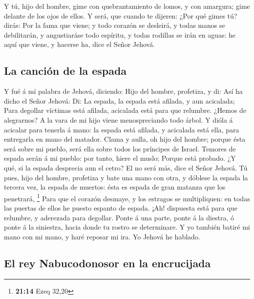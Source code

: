  Y tú, hijo del hombre, gime con quebrantamiento de lomos,
y con amargura; gime delante de los ojos de ellos.  Y
será, que cuando te dijeren: ¿Por qué gimes tú? dirás: Por la fama que
viene; y todo corazón se desleirá, y todas manos se debilitarán, y
angustiaráse todo espíritu, y todas rodillas se irán en aguas: he aquí
que viene, y hacerse ha, dice el Señor Jehová.

\hypertarget{la-canciuxf3n-de-la-espada}{%
\subsection{La canción de la espada}\label{la-canciuxf3n-de-la-espada}}

 Y fué á mí palabra de Jehová, diciendo: 
Hijo del hombre, profetiza, y di: Así ha dicho el Señor Jehová: Di: La
espada, la espada está afilada, y aun acicalada;  Para
degollar víctimas está afilada, acicalada está para que relumbre. ¿Hemos
de alegrarnos? A la vara de mi hijo viene menospreciando todo árbol.
 Y dióla á acicalar para tenerla á mano: la espada está
afilada, y acicalada está ella, para entregarla en mano del matador.
 Clama y aulla, oh hijo del hombre; porque ésta será
sobre mi pueblo, será ella sobre todos los príncipes de Israel. Temores
de espada serán á mi pueblo: por tanto, hiere el muslo; 
Porque está probado. ¿Y qué, si la espada desprecia aun el cetro? El no
será más, dice el Señor Jehová.  Tú pues, hijo del
hombre, profetiza y bate una mano con otra, y dóblese la espada la
tercera vez, la espada de muertos: ésta es espada de gran matanza que
los penetrará, \footnote{\textbf{21:14} Ezeq 32,20}  Para
que el corazón desmaye, y los estragos se multipliquen: en todas las
puertas de ellos he puesto espanto de espada. ¡Ah! dispuesta está para
que relumbre, y aderezada para degollar.  Ponte á una
parte, ponte á la diestra, ó ponte á la siniestra, hacia donde tu rostro
se determinare.  Y yo también batiré mi mano con mi mano,
y haré reposar mi ira. Yo Jehová he hablado.

\hypertarget{el-rey-nabucodonosor-en-la-encrucijada}{%
\subsection{El rey Nabucodonosor en la
encrucijada}\label{el-rey-nabucodonosor-en-la-encrucijada}}

